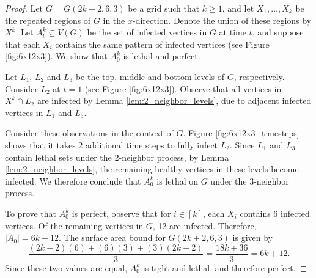 \begin{proof}
Let $G=G(2k+2,6,3)$ be a grid such that $k \geq 1$, and let $X_1, \dots, X_{k}$ be the repeated regions of $G$ in the $x$-direction. Denote the union of these regions by $X^k$. Let $A_t^k \subseteq V(G)$ be the set of infected vertices in $G$ at time $t$, and suppose that each $X_i$ contains the same pattern of infected vertices (see Figure \ref{fig:6x12x3}). We show that $A_0^k$ is lethal and perfect. 

Let $L_1$, $L_2$ and $L_3$ be the top, middle and bottom levels of $G$, respectively. Consider $L_2$ at $t=1$ (see Figure \ref{fig:6x12x3}). Observe that all vertices in $X^k \cap L_2$ are infected by Lemma \ref{lem:2_neighbor_levels}, due to adjacent infected vertices in $L_1$ and $L_3$. 

Consider these observations in the context of $G$. Figure \ref{fig:6x12x3_timesteps} shows that it takes 2 additional time steps to fully infect $L_2$. Since $L_1$ and $L_3$ contain lethal sets under the 2-neighbor process, by Lemma \ref{lem:2_neighbor_levels}, the remaining healthy vertices in these levels become infected. We therefore conclude that $A_0^k$ is lethal on $G$ under the 3-neighbor process.

To prove that $A_0^k$ is perfect, observe that for $i \in [k]$, each $X_i$ contains 6 infected vertices. Of the remaining vertices in $G$, 12 are infected. Therefore, $|A_0| = 6k+12$. The surface area bound for $G(2k+2,6,3)$ is given by
$$\frac{(2k+2)(6) + (6)(3) + (3)(2k+2)}{3} = \frac{18k + 36}{3} = 6k+12.$$
Since these two values are equal, $A_0^k$ is tight and lethal, and therefore perfect.
\end{proof}

